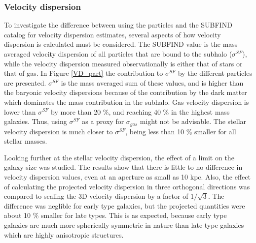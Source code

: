 \subsubsection{Velocity dispersion}
To investigate the difference between using the particles and the SUBFIND catalog for velocity dispersion estimates, several aspects of how velocity dispersion is calculated must be considered. The SUBFIND value is the mass averaged velocity dispersion of all particles that are bound to the subhalo ($\sigma^{SF}$), while the velocity dispersion measured observationally is either that of stars or that of gas. In Figure \ref{VD_part} the contribution to $\sigma^{SF}$ by the different particles are presented. $\sigma^{SF}$ is the mass averaged sum of these values, and is higher than the baryonic velocity dispersions because of the contribution by the dark matter which dominates the mass contribution in the subhalo. Gas velocity dispersion is lower than $\sigma^{SF}$ by more than 20 \%, and reaching 40 \% in the highest mass galaxies. Thus, using $\sigma^{SF}$ as a proxy for $\sigma_{gas}$ might not be advisable. The stellar velocity dispersion is much closer to $\sigma^{SF}$, being less than 10 \% smaller for all stellar masses. 

Looking further at the stellar velocity dispersion, the effect of a limit on the galaxy size was studied. The results show that there is little to no difference in velocity dispersion values, even at an aperture as small as 10 kpc. Also, the effect of calculating the projected velocity dispersion in three orthogonal directions was compared to scaling the 3D velocity dispersion by a factor of $1/\sqrt{3}$. The difference was neglible for early type galaxies, but the projected quantities were about 10 \% smaller for late types. This is as expected, because early type galaxies are much more spherically symmetric in nature than late type galaxies which are highly anisotropic structures. 

